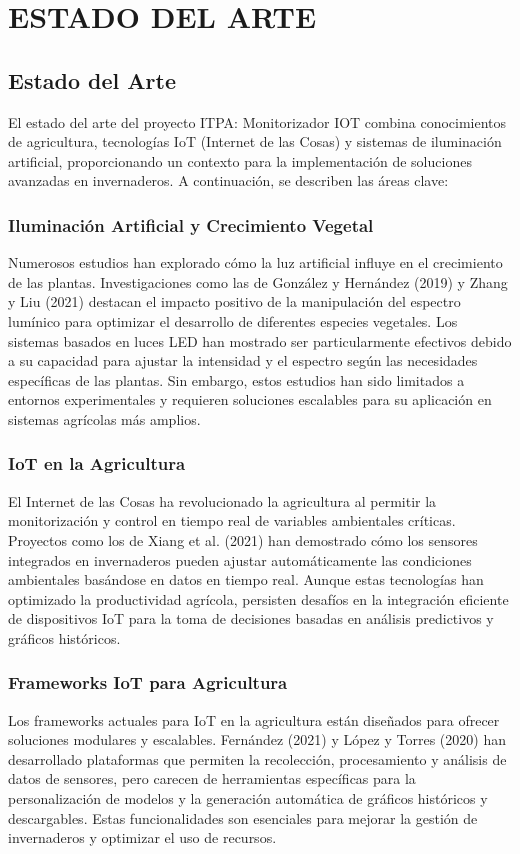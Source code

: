 \chapter{ESTADO DEL ARTE}

\section{Estado del Arte}

El estado del arte del proyecto ITPA: Monitorizador IOT combina conocimientos de agricultura, tecnologías IoT (Internet de las Cosas) y sistemas de iluminación artificial, proporcionando un contexto para la implementación de soluciones avanzadas en invernaderos. A continuación, se describen las áreas clave:

\subsection{Iluminación Artificial y Crecimiento Vegetal}
Numerosos estudios han explorado cómo la luz artificial influye en el crecimiento de las plantas. Investigaciones como las de González y Hernández (2019) y Zhang y Liu (2021) destacan el impacto positivo de la manipulación del espectro lumínico para optimizar el desarrollo de diferentes especies vegetales. Los sistemas basados en luces LED han mostrado ser particularmente efectivos debido a su capacidad para ajustar la intensidad y el espectro según las necesidades específicas de las plantas. Sin embargo, estos estudios han sido limitados a entornos experimentales y requieren soluciones escalables para su aplicación en sistemas agrícolas más amplios.

\subsection{IoT en la Agricultura}
El Internet de las Cosas ha revolucionado la agricultura al permitir la monitorización y control en tiempo real de variables ambientales críticas. Proyectos como los de Xiang et al. (2021) han demostrado cómo los sensores integrados en invernaderos pueden ajustar automáticamente las condiciones ambientales basándose en datos en tiempo real. Aunque estas tecnologías han optimizado la productividad agrícola, persisten desafíos en la integración eficiente de dispositivos IoT para la toma de decisiones basadas en análisis predictivos y gráficos históricos.

\subsection{Frameworks IoT para Agricultura}
Los frameworks actuales para IoT en la agricultura están diseñados para ofrecer soluciones modulares y escalables. Fernández (2021) y López y Torres (2020) han desarrollado plataformas que permiten la recolección, procesamiento y análisis de datos de sensores, pero carecen de herramientas específicas para la personalización de modelos y la generación automática de gráficos históricos y descargables. Estas funcionalidades son esenciales para mejorar la gestión de invernaderos y optimizar el uso de recursos.

